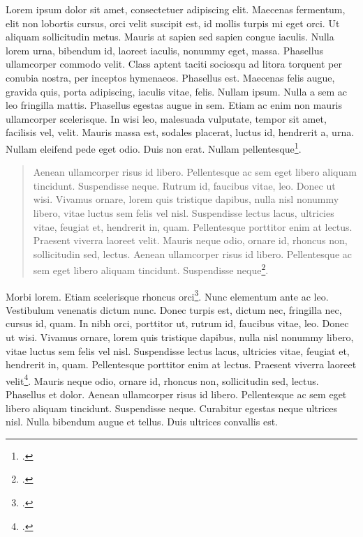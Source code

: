 Lorem ipsum dolor sit amet, consectetuer adipiscing elit. Maecenas fermentum, elit non lobortis cursus, orci velit suscipit est, id mollis turpis mi eget orci. Ut aliquam sollicitudin metus. Mauris at sapien sed sapien congue iaculis. Nulla lorem urna, bibendum id, laoreet iaculis, nonummy eget, massa. Phasellus ullamcorper commodo velit. Class aptent taciti sociosqu ad litora torquent per conubia nostra, per inceptos hymenaeos. Phasellus est. Maecenas felis augue, gravida quis, porta adipiscing, iaculis vitae, felis. Nullam ipsum. Nulla a sem ac leo fringilla mattis. Phasellus egestas augue in sem. Etiam ac enim non mauris ullamcorper scelerisque. In wisi leo, malesuada vulputate, tempor sit amet, facilisis vel, velit. Mauris massa est, sodales placerat, luctus id, hendrerit a, urna. Nullam eleifend pede eget odio. Duis non erat. Nullam pellentesque\footcite[56]{Desfois1998}.


\begin{quote}
Aenean ullamcorper risus id libero. Pellentesque ac sem eget libero aliquam tincidunt. Suspendisse neque. Rutrum id, faucibus vitae, leo. Donec ut wisi. Vivamus ornare, lorem quis tristique dapibus, nulla nisl nonummy libero, vitae luctus sem felis vel nisl. Suspendisse lectus lacus, ultricies vitae, feugiat et, hendrerit in, quam. Pellentesque porttitor enim at lectus. Praesent viverra laoreet velit. Mauris neque odio, ornare id, rhoncus non, sollicitudin sed, lectus. Aenean ullamcorper risus id libero. Pellentesque ac sem eget libero aliquam tincidunt. Suspendisse neque\footcite[voir \pno~154]{Georges1974}.
\end{quote}

Morbi lorem. Etiam scelerisque rhoncus orci\footcite{Georges1974}. Nunc elementum ante ac leo. Vestibulum venenatis dictum nunc. Donec turpis est, dictum nec, fringilla nec, cursus id, quam. In nibh orci, porttitor ut, rutrum id, faucibus vitae, leo. Donec ut wisi. Vivamus ornare, lorem quis tristique dapibus, nulla nisl nonummy libero, vitae luctus sem felis vel nisl. Suspendisse lectus lacus, ultricies vitae, feugiat et, hendrerit in, quam. Pellentesque porttitor enim at lectus. Praesent viverra laoreet velit\footcite[56]{Desfois1998}. Mauris neque odio, ornare id, rhoncus non, sollicitudin sed, lectus. Phasellus et dolor. Aenean ullamcorper risus id libero. Pellentesque ac sem eget libero aliquam tincidunt. Suspendisse neque. Curabitur egestas neque ultrices nisl. Nulla bibendum augue et tellus. Duis ultrices convallis est.

